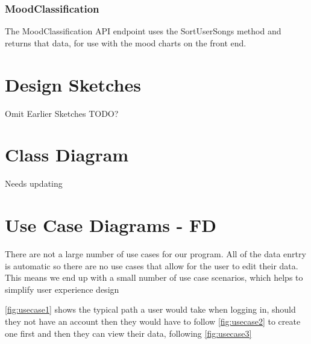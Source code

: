 \documentclass[11pt]{report}
\begin{document}
\subsubsection{MoodClassification}
The MoodClassification API endpoint uses the SortUserSongs method and returns that data, for use with the mood charts on the front end.


\section{Design Sketches}

Omit Earlier Sketches
TODO?

\section{Class Diagram}

Needs updating

\section{Use Case Diagrams - FD}

There are not a large number of use cases for our program. All of the data enrtry is automatic so there are no use cases that allow for the user to edit their data. This means we end up with a small number of use case scenarios, which helps to simplify user experience design

\ref{fig:usecase1} shows the typical path a user would take when logging in, should they not have an account then they would have to follow \ref{fig:usecase2} to create one first and then they can view their data, following \ref{fig:usecase3}
\end{document}
